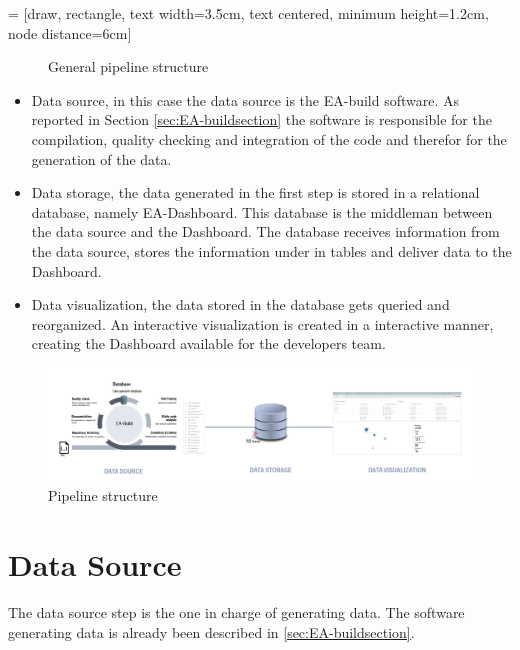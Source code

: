 \documentclass[../main.tex]{subfiles}
\begin{document}
 = [draw, rectangle, text width=3.5cm, text centered, minimum height=1.2cm, node distance=6cm]
\begin{figure}[h]
  \centering
{}
  \caption{General pipeline structure}
  \label{fig:pipelinestructure}
\end{figure}

\begin{itemize}
    \item Data source, in this case the data source is the EA-build software. As reported in Section \ref{sec:EA-buildsection} the software is responsible for the compilation, quality checking and integration of the code and therefor for the generation of the data. 
    \item Data storage, the data generated in the first step is stored in a relational database, namely EA-Dashboard. This database is the middleman between the data source and the Dashboard. The database receives information from the data source, stores the information under in tables and deliver data to the Dashboard.
    \item Data visualization, the data stored in the database gets queried and reorganized. An interactive visualization is created in a interactive manner, creating the Dashboard available for the developers team.
\end{itemize}
\begin{figure}[h]
    \centering
    \includegraphics[width=\linewidth]{images_folder/pipeline_1.png}
    \caption{Pipeline structure}
    \label{fig:pipeline1}
\end{figure}
\section{Data Source}\label{sec:datasource}
The data source step is the one in charge of generating data. The software generating data is already been described in \ref{sec:EA-buildsection}. 
\end{document}
